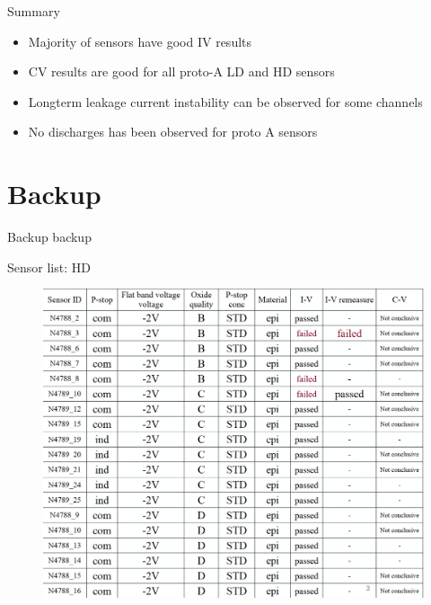 \documentclass{beamer}
\begin{document}
\begin{frame}{Summary}
  \begin{itemize}
    \item Majority of sensors have good IV results
    \item CV results are good for all proto-A LD and HD sensors
    \item Longterm leakage current instability can be observed  for some channels
    \item No discharges has been observed for proto A sensors
  \end{itemize}
\end{frame}

\section*{Backup}

\begin{frame}{Backup}
	\center
	\huge
	backup
\end{frame}

\begin{frame}{Sensor list: HD}
   \begin{figure}
       \includegraphics[width=.8\textwidth]{plots/PM8_sensorList.png}
   \end{figure} 
\end{frame}
\end{document}
